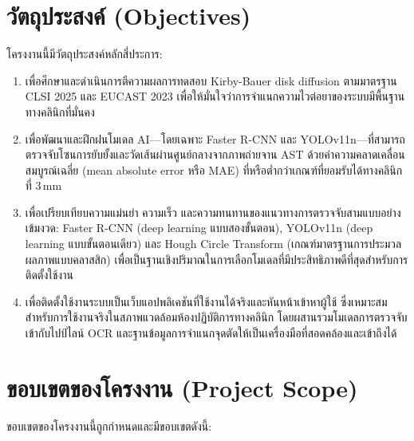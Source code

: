\section{วัตถุประสงค์ (Objectives)}

โครงงานนี้มีวัตถุประสงค์หลักสี่ประการ:
\begin{enumerate}
  \item เพื่อศึกษาและดำเนินการตีความผลการทดสอบ Kirby-Bauer disk diffusion ตามมาตรฐาน CLSI 2025 \cite{clsi2025} และ EUCAST 2023 \cite{eucast2023} เพื่อให้มั่นใจว่าการจำแนกความไวต่อยาของระบบมีพื้นฐานทางคลินิกที่มั่นคง
  \item เพื่อพัฒนาและฝึกฝนโมเดล AI---โดยเฉพาะ Faster R-CNN และ YOLOv11n---ที่สามารถตรวจจับโซนการยับยั้งและวัดเส้นผ่านศูนย์กลางจากภาพถ่ายจาน AST ด้วยค่าความคลาดเคลื่อนสมบูรณ์เฉลี่ย (mean absolute error หรือ MAE) ที่หรือต่ำกว่าเกณฑ์ที่ยอมรับได้ทางคลินิกที่ 3\,mm \cite{humphries2018}
  \item เพื่อเปรียบเทียบความแม่นยำ ความเร็ว และความทนทานของแนวทางการตรวจจับสามแบบอย่างเข้มงวด: Faster R-CNN (deep learning แบบสองขั้นตอน), YOLOv11n (deep learning แบบขั้นตอนเดียว) และ Hough Circle Transform (เกณฑ์มาตรฐานการประมวลผลภาพแบบคลาสสิก) เพื่อเป็นฐานเชิงปริมาณในการเลือกโมเดลที่มีประสิทธิภาพดีที่สุดสำหรับการติดตั้งใช้งาน
  \item เพื่อติดตั้งใช้งานระบบเป็นเว็บแอปพลิเคชันที่ใช้งานได้จริงและหันหน้าเข้าหาผู้ใช้ ซึ่งเหมาะสมสำหรับการใช้งานจริงในสภาพแวดล้อมห้องปฏิบัติการทางคลินิก โดยผสานรวมโมเดลการตรวจจับเข้ากับไปป์ไลน์ OCR และฐานข้อมูลการจำแนกจุดตัดให้เป็นเครื่องมือที่สอดคล้องและเข้าถึงได้
\end{enumerate}

\section{ขอบเขตของโครงงาน (Project Scope)}

ขอบเขตของโครงงานนี้ถูกกำหนดและมีขอบเขตดังนี้:

